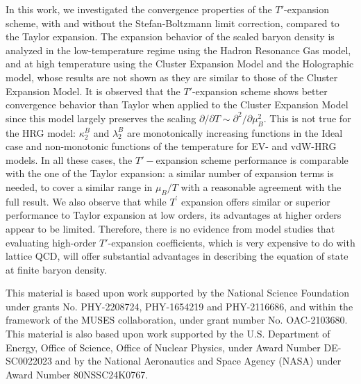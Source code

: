 \documentclass[%
 reprint,
nofootinbib,
 amsmath,amssymb,
 aps,
prc
]{revtex4-2}
\begin{document}
In this work, we investigated the convergence properties of the 
$T'$-expansion scheme, with and without the Stefan-Boltzmann limit correction, compared to the Taylor expansion. The expansion behavior of the scaled baryon density is analyzed in the low-temperature regime using the Hadron Resonance Gas model, and at high temperature using the Cluster Expansion Model and the Holographic model, whose results are not shown as they are similar to those of the Cluster Expansion Model.
It is observed that the $T'$-expansion scheme shows better convergence behavior than Taylor when applied to the Cluster Expansion Model since this model largely preserves the scaling $\partial/\partial T \sim \partial^2/\partial\mu_B^2$. This is not true for the HRG model: $\kappa_2^B$ and $\lambda_2^B$ are monotonically increasing functions in the Ideal case and non-monotonic functions of the temperature for EV- and vdW-HRG models. In all these cases, the $T'-$expansion scheme performance is comparable with the one of the Taylor expansion: a similar number of expansion terms is needed, to cover a similar range in $\mu_B/T$ with a reasonable agreement with the full result.
We also observe that while $T^{\prime}$ expansion offers similar or superior performance to Taylor expansion at low orders, its advantages at higher orders appear to be limited.
Therefore, there is no evidence from model studies that evaluating high-order $T'$-expansion coefficients, which is very expensive to do with lattice QCD, will offer substantial advantages in describing the equation of state at finite baryon density. 


\begin{acknowledgments}
This material is based upon work supported by the National Science Foundation under grants No. PHY-2208724, PHY-1654219 and PHY-2116686, and within the framework of the MUSES collaboration, under grant number No. OAC-2103680. This material is also based upon work supported by the U.S. Department of Energy, Office of Science, Office of Nuclear Physics, under Award Number
DE-SC0022023 and by the National Aeronautics and Space Agency (NASA) under Award Number 80NSSC24K0767.

\end{acknowledgments}

\end{document}

